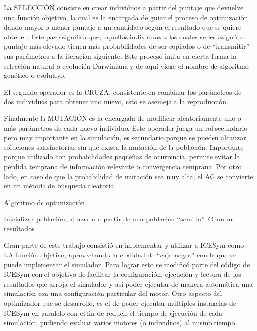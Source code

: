 La SELECCIÓN consiste en crear individuos a partir del puntaje que devuelve
una función objetivo, la cual es la encargada de guiar el proceso de
optimización dando mayor o menor puntaje a un candidato según el resultado que
se quiere obtener.
%
Este paso significa que, aquellos individuos a los cuales se les asignó un
puntaje más elevado tienen más probabilidades de ser copiados o de
``transmitir'' sus parámetros a la iteración siguiente.
%
Este proceso imita en cierta forma la selección natural o evolución Darwiniana y
de aquí viene el nombre de algoritmo genético o evolutivo.

El segundo operador es la CRUZA, consistente en combinar los parámetros de dos
individuos para obtener uno nuevo, esto se asemeja a la reproducción.

Finalmente la MUTACIÓN es la encargada de modificar aleatoriamente uno o más
parámetros de cada nuevo individuo.
%
Este operador juega un rol secundario pero muy importante en la simulación, es
secundario porque se pueden alcanzar soluciones satisfactorias sin que exista la
mutación de la población.
%
Importante porque utilizado con probabilidades pequeñas de ocurrencia, permite
evitar la pérdida temprana de información relevante o convergencia temprana.
%
Por otro lado, en caso de que la probabilidad de mutación sea muy alta, el AG se
convierte en un método de búsqueda aleatoria.

\begin{algorithm} \caption{Algoritmo de optimización}\label{algo:genetico}
  Inicializar población, al azar o a partir de una población ``semilla''.\;
  {Guardar resultados\;}
\end{algorithm}

%
%
Gran parte de este trabajo consistió en implementar y utilizar a ICESym como LA
función objetivo, aprovechando la cualidad de ``caja negra'' con la que se puede
implementar el simulador.
%
Para lograr esto se modificó parte del código de ICESym con el objetivo de
facilitar la configuración, ejecución y lectura de los resultados que arroja el
simulador y así poder ejecutar de manera automática una simulación con una
configuración particular del motor.
%
Otro aspecto del optimizador que se desarrolló, es el de poder ejecutar
múltiples instancias de ICESym en paralelo con el fin de reducir el tiempo de
ejecución de cada simulación, pudiendo evaluar varios motores (o individuos) al
mismo tiempo.

